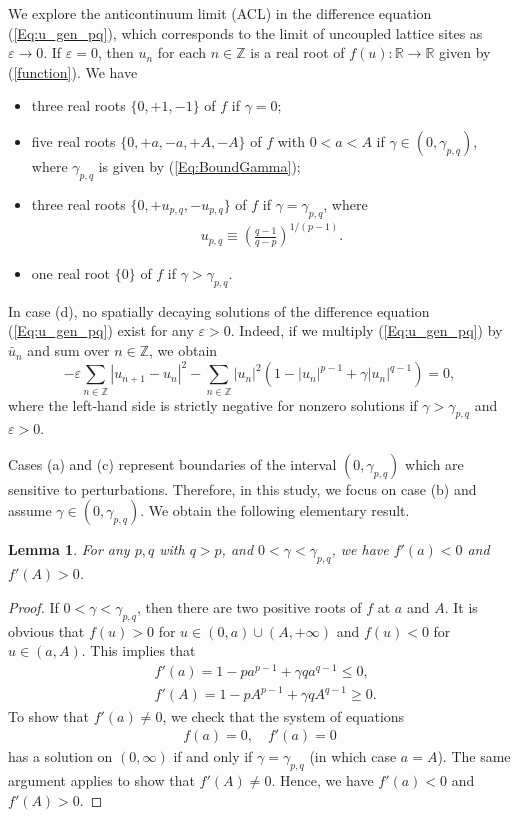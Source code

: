 \documentclass[12pt,reqno]{amsart}
\newtheorem{lemma}{Lemma}
\begin{document}
We explore the anticontinuum limit (ACL) in the difference equation (\ref{Eq:u_gen_pq}), which corresponds to the limit of uncoupled lattice sites as $\varepsilon \to 0$. If $\varepsilon = 0$, then $u_n$ for each $n \in \mathbb{Z}$ is a real root of $f(u) : \mathbb{R} \to \mathbb{R}$ given by (\ref{function}). We have 
\begin{itemize}
    \item[(a)] three real roots $\{0,+1,-1\}$ of $f$ if $\gamma=0$;
    \item[(b)] five real roots $\{0,+a,-a,+A,-A\}$ of $f$ with $0<a<A$ if $\gamma \in (0,\gamma_{p,q})$, where $\gamma_{p,q}$ is given by (\ref{Eq:BoundGamma}); 
    \item[(c)] three real roots $\{ 0, +u_{p,q}, -u_{p,q}\}$ of $f$ if $\gamma=\gamma_{{p,q}}$, where
    \begin{gather*}
        u_{p,q} \equiv \left(\frac{q-1}{q-p}\right)^{1/(p-1)}.
    \end{gather*}
    \item[(d)] one real root $\{ 0 \}$ of $f$ if $\gamma>\gamma_{{p,q}}$.
\end{itemize}

In case (d), no spatially decaying solutions of the difference equation (\ref{Eq:u_gen_pq}) exist for any $\varepsilon>0$. Indeed, if we multiply (\ref{Eq:u_gen_pq}) by $\bar{u}_n$ and sum over $n \in \mathbb{Z}$, we obtain 
$$
-\varepsilon \sum_{n \in \mathbb{Z}} |u_{n+1}-u_n|^2 - \sum_{n \in \mathbb{Z}} |u_n|^2 (1-|u_n|^{p-1} + \gamma |u_n|^{q-1}) = 0,
$$
where the left-hand side is strictly negative for nonzero solutions if $\gamma > \gamma_{p,q}$ and $\varepsilon > 0$. 

Cases (a) and (c) represent boundaries of the interval $(0,\gamma_{{p,q}})$ which are sensitive to perturbations. Therefore, in this study, we focus on case (b) and assume $\gamma \in (0,\gamma_{{p,q}})$. We obtain the following elementary result.

\begin{lemma}
	\label{lem-1}
	For any $p,q$ with $q>p$, and $0<\gamma<\gamma_{{p,q}}$, we have  $f'(a) < 0$ and $f'(A) > 0$.
\end{lemma}

\begin{proof}
	
	If $0<\gamma<\gamma_{{p,q}}$, then there are two positive roots of $f$ at $a$ and $A$. It is obvious that $f(u) > 0$ for $u \in (0,a) \cup (A,+\infty)$ and $f(u) < 0$ for $u \in (a,A)$. This implies that
	\begin{align*}
	&f'(a)=1-pa^{p-1}+\gamma qa^{q-1}\leq 0, \\
	&f'(A)=1-pA^{p-1}+\gamma qA^{q-1}\geq 0.
	\end{align*}
	To show that $f'(a) \neq 0$, we check that the system of equations
	\begin{gather*}
	f(a)=0,\quad f'(a)=0
	\end{gather*}
	has a solution on $(0,\infty)$ if and only if $\gamma=\gamma_{{p,q}}$ (in which case $a=A$). The same argument applies to show that $f'(A) \neq 0$. Hence, we have $f'(a) < 0$ and $f'(A) > 0$.  
\end{proof}
\end{document}
